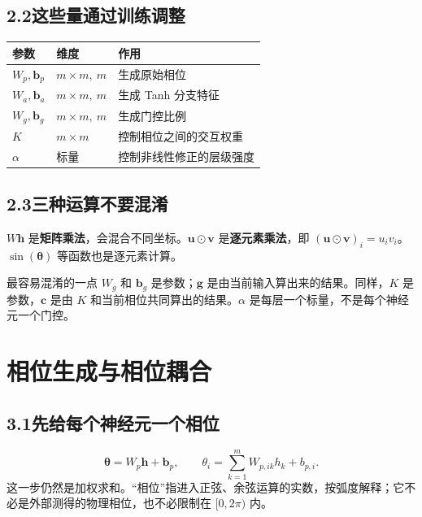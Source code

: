 \documentclass[UTF8,11pt,a4paper,fontset=fandol]{ctexart}
\newcommand{\newsection}[1]{\clearpage\section{#1}}
\begin{document}
\subsection*{2.2\quad 这些量通过训练调整}
\par\smallskip\noindent\begin{tabularx}{\linewidth}{@{}p{37mm}p{25mm}Y@{}}
\toprule
\textbf{参数}&\textbf{维度}&\textbf{作用}\\\midrule
$W_p,\boldsymbol{b}_p$&$m\times m,\ m$&生成原始相位\\
$W_a,\boldsymbol{b}_a$&$m\times m,\ m$&生成 Tanh 分支特征\\
$W_g,\boldsymbol{b}_g$&$m\times m,\ m$&生成门控比例\\
$K$&$m\times m$&控制相位之间的交互权重\\
$\alpha$&标量&控制非线性修正的层级强度\\\bottomrule
\end{tabularx}\par\smallskip
\subsection*{2.3\quad 三种运算不要混淆}
$W\boldsymbol{h}$ 是\textbf{矩阵乘法}，会混合不同坐标。$\boldsymbol{u}\odot\boldsymbol{v}$ 是\textbf{逐元素乘法}，即 $(\boldsymbol{u}\odot\boldsymbol{v})_i=u_iv_i$。$\sin(\boldsymbol{\theta})$ 等函数也是逐元素计算。
\begin{notebox}{最容易混淆的一点}
$W_g$ 和 $\boldsymbol{b}_g$ 是参数；$\boldsymbol{g}$ 是由当前输入算出来的结果。同样，$K$ 是参数，$\boldsymbol{c}$ 是由 $K$ 和当前相位共同算出的结果。$\alpha$ 是每层一个标量，不是每个神经元一个门控。
\end{notebox}

\newsection{相位生成与相位耦合}
\subsection*{3.1\quad 先给每个神经元一个相位}
\begin{equation}\label{eq:phase}
\boxed{\boldsymbol{\theta}=W_p\boldsymbol{h}+\boldsymbol{b}_p},\qquad
\theta_i=\sum_{k=1}^{m}W_{p,ik}h_k+b_{p,i}.
\end{equation}
这一步仍然是加权求和。“相位”指进入正弦、余弦运算的实数，按弧度解释；它不必是外部测得的物理相位，也不必限制在 $[0,2\pi)$ 内。
\end{document}
